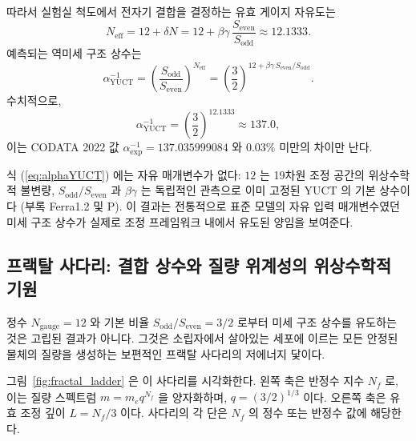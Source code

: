 \documentclass[12pt,a4paper]{article}
\begin{document}
	따라서 실험실 척도에서 전자기 결합을 결정하는 유효 게이지 자유도는
	\begin{equation}
		N_{\mathrm{eff}} = 12 + \delta N = 12 + \beta\gamma\,\frac{S_{\mathrm{even}}}{S_{\mathrm{odd}}} \approx 12.1333 .
	\end{equation}
	예측되는 역미세 구조 상수는
	\begin{equation}
		\boxed{\alpha^{-1}_{\mathrm{YUCT}} = \left( \frac{S_{\mathrm{odd}}}{S_{\mathrm{even}}} \right)^{N_{\mathrm{eff}}}
			= \left( \frac{3}{2} \right)^{12 + \beta\gamma\,S_{\mathrm{even}}/S_{\mathrm{odd}}} } .
		\label{eq:alphaYUCT}
	\end{equation}
	수치적으로,
	\[
	\alpha^{-1}_{\mathrm{YUCT}} = \left( \frac{3}{2} \right)^{12.1333} \approx 137.0 ,
	\]
	이는 CODATA 2022 값 \(\alpha^{-1}_{\mathrm{exp}} = 137.035999084\) 와 \(0.03\%\) 미만의 차이만 난다.
	
	식 (\ref{eq:alphaYUCT}) 에는 자유 매개변수가 없다: \(12\) 는 19차원 조정 공간의 위상수학적 불변량, \(S_{\mathrm{odd}}/S_{\mathrm{even}}\) 과 \(\beta\gamma\) 는 독립적인 관측으로 이미 고정된 YUCT 의 기본 상수이다 (부록 Ferra1.2 및 P).  
	이 결과는 전통적으로 표준 모델의 자유 입력 매개변수였던 미세 구조 상수가 실제로 조정 프레임워크 내에서 유도된 양임을 보여준다.
	
	\subsection{프랙탈 사다리: 결합 상수와 질량 위계성의 위상수학적 기원}
	\label{sec:fractal_ladder}
	
	정수 \(N_{\mathrm{gauge}}=12\) 와 기본 비율 \(S_{\mathrm{odd}}/S_{\mathrm{even}}=3/2\) 로부터 미세 구조 상수를 유도하는 것은 고립된 결과가 아니다. 그것은 소립자에서 살아있는 세포에 이르는 모든 안정된 물체의 질량을 생성하는 보편적인 프랙탈 사다리의 저에너지 닻이다.
	
	그림~\ref{fig:fractal_ladder} 은 이 사다리를 시각화한다. 왼쪽 축은 반정수 지수 \(N_f\) 로, 이는 질량 스펙트럼 \(m = m_e q^{N_f}\) 을 양자화하며, \(q = (3/2)^{1/3}\) 이다. 오른쪽 축은 유효 조정 깊이 \(L = N_f/3\) 이다. 사다리의 각 단은 \(N_f\) 의 정수 또는 반정수 값에 해당한다.
	
\end{document}
